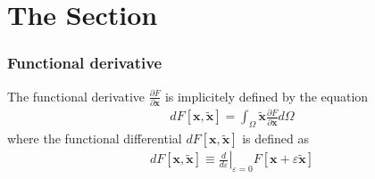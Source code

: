 \section{The Section}
\begin{frame}
  \frametitle{Functional derivative}
  The functional derivative  $\frac{\partial F}{\partial\mathbf{x}}$ is implicitely defined by the equation
  \begin{align*}
dF\left[\mathbf{x},\tilde{\mathbf{x}}\right]=\int_{\Omega}\tilde{\mathbf{x}}\frac{\partial F}{\partial\mathbf{x}}d\Omega
  \end{align*}
  where the functional differential $dF\left[\mathbf{x},\tilde{\mathbf{x}}\right]$ is defined as
  \begin{align*}
    dF\left[\mathbf{x},\tilde{\mathbf{x}}\right]\equiv\left.\frac{d}{d\varepsilon}\right|_{\varepsilon=0}F\left[\mathbf{x}+\varepsilon\tilde{\mathbf{x}}\right]
  \end{align*}
\end{frame}
